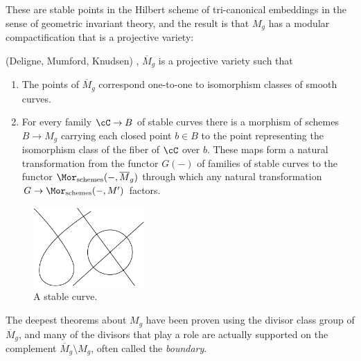 These are stable points in the Hilbert scheme of tri-canonical embeddings in the sense of geometric invariant theory, and the result is that $M_g$ has a modular compactification that is a projective variety:


\begin{theorem}(Deligne, Mumford, Knudsen) \cite{Deligne-Mumford}, \cite{MR702954}\label{DM is coarse}
$\overline M_g$ is a projective variety such that
\begin{enumerate}
 \item The points of $\overline M_g$ correspond one-to-one to isomorphism classes of smooth curves.
 \item For every family $\cC \to B$ of stable curves there is a morphism of schemes $B\to M_g$ carrying
 each closed point  $b \in B$ to the point representing the isomorphism class of the fiber of $\cC$ over $b$. 
 These maps form a natural transformation from the functor $G(-)$ of families of stable curves to the functor 
 $\Mor_{\rm schemes}(-, \overline M_g)$ through which any natural transformation $G \to \Mor_{\rm schemes}(-, M')$
 factors.
\end{enumerate}
\end{theorem}

\begin{figure}\label{Fig7.2}
\centerline {\includegraphics[height=1.2in]{"main/Fig07-2"}}
\caption{A stable curve.}
\end{figure}

%
%
The deepest theorems about $M_{g}$ have been proven using the divisor class group of $\overline M_{g}$,
and many of the divisors that play a role are actually supported on the complement $\overline M_{g} \setminus M_{g}$, often called the \emph{boundary}.

